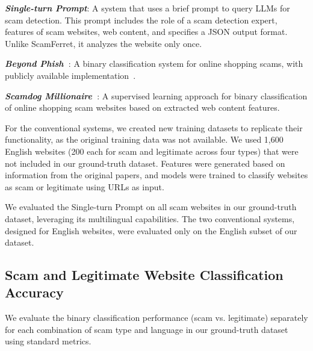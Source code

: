 \documentclass[runningheads]{llncs}
\begin{document}
\noindent\textbf{\textit{{Single-turn Prompt}}}: A system that uses a brief prompt to query LLMs for scam detection.
This prompt includes the role of a scam detection expert, features of scam websites, web content, and specifies a JSON output format.
Unlike ScamFerret, it analyzes the website only once.

\noindent\textbf{\textit{{Beyond Phish~\cite{DBLP:conf/sp/BitaabCOLWAWBSD23}}}}: A binary classification system for online shopping scams, with publicly available implementation~\cite{eng_beyond}.

\noindent\textbf{\textit{Scamdog Millionaire~\cite{DBLP:conf/acsac/KotziasRPSB23}}}: A supervised learning approach for binary classification of online shopping scam websites based on extracted web content features.

For the conventional systems, we created new training datasets to replicate their functionality, as the original training data was not available.
We used 1,600 English websites (200 each for scam and legitimate across four types) that were not included in our ground-truth dataset.
Features were generated based on information from the original papers, and models were trained to classify websites as scam or legitimate using URLs as input.

We evaluated the Single-turn Prompt on all scam websites in our ground-truth dataset, leveraging its multilingual capabilities.
The two conventional systems, designed for English websites, were evaluated only on the English subset of our dataset.

\subsection{Scam and Legitimate Website Classification Accuracy}
\label{subsec:evaluation_accuracy}
We evaluate the binary classification performance (scam vs. legitimate) separately for each combination of scam type and language in our ground-truth dataset using standard metrics.

  

  
\end{document}
